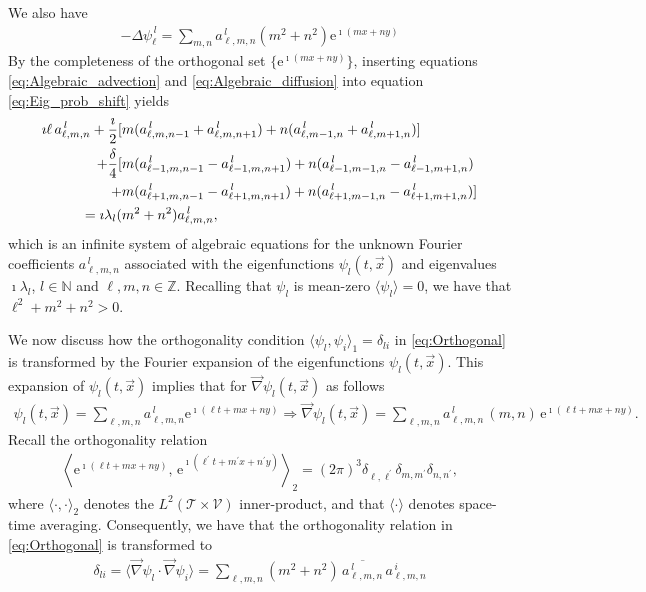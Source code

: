 \documentclass{article}
\newcommand{\e}{\mathrm{e}}
\newcommand{\Tc}{\mathcal{T}}
\newcommand{\Vc}{\mathcal{V}}
\newcommand{\0}{\mathbf{0}}
\newcommand{\1}{\mathbf{1}}
\newcommand{\2}{\mathbf{2}}
\newcommand{\3}{\mathbf{3}}
\newcommand{\4}{\mathbf{4}}
\newcommand{\5}{\mathbf{5}}
\newcommand{\6}{\mathbf{6}}
\newcommand{\7}{\mathbf{7}}
\newcommand{\8}{\mathbf{8}}
\begin{document}
%
We also have 
%
\begin{align}\label{eq:Algebraic_diffusion}
  -\Delta\psi_\ell^{\,l}=\sum_{m,n}a^{\,l}_{\ell,m,n}(m^2+n^2)\e^{\imath (mx+ny)}
\end{align}
%
By the completeness of the orthogonal set $\{\e^{\imath (mx+ny)}\}$, 
inserting equations \eqref{eq:Algebraic_advection} and
\eqref{eq:Algebraic_diffusion} into equation
\eqref{eq:Eig_prob_shift} yields
%
\begin{align}\label{eq:Fourier_Coef_System}
\imath \ell\,a^{\,l}_{\ell,m,n}+\frac{\imath}{2}
[&m(a^{\,l}_{\ell,m,n-1}+a^{\,l}_{\ell,m,n+1})+n(a^{\,l}_{\ell,m-1,n}+a^{\,l}_{\ell,m+1,n})]
\notag\\
+\frac{\delta}{4}[&m(a^{\,l}_{\ell-1,m,n-1}-a^{\,l}_{\ell-1,m,n+1})+n(a^{\,l}_{\ell-1,m-1,n}-a^{\,l}_{\ell-1,m+1,n})
\notag\\
+&m(a^{\,l}_{\ell+1,m,n-1}-a^{\,l}_{\ell+1,m,n+1})+n(a^{\,l}_{\ell+1,m-1,n}-a^{\,l}_{\ell+1,m+1,n})]
\notag\\
=\imath\lambda_l(&m^2+n^2)a^{\,l}_{\ell,m,n},
\end{align}
%
which is an infinite system of algebraic equations for the unknown
Fourier coefficients $a^{\,l}_{\ell,m,n}$ associated with the
eigenfunctions $\psi_l(t,\vec{x})$ and eigenvalues $\imath\lambda_l$,
$l\in\mathbb{N}$ and $\ell,m,n\in\mathbb{Z}$. Recalling that $\psi_l$ is
mean-zero $\langle\psi_l\rangle=0$, we have that $\ell^2+m^2+n^2>0$.




We now discuss how the orthogonality condition
$\langle\psi_l,\psi_i\rangle_1=\delta_{li}$ in \eqref{eq:Orthogonal} is
transformed by the Fourier expansion of the
eigenfunctions $\psi_l(t,\vec{x})$. This expansion of $\psi_l(t,\vec{x})$ 
implies that for $\vec{\nabla}\psi_l(t,\vec{x})$ as follows 
%
\begin{align}\label{eq:Eigenfunction_Grad_expansion}
  \psi_l(t,\vec{x})=\sum_{\ell,m,n}a^{\,l}_{\ell,m,n}\e^{\imath (\ell t+mx+ny)}\Rightarrow
  \vec{\nabla}\psi_l(t,\vec{x})=\sum_{\ell,m,n}a^{\,l}_{\ell,m,n}\,(m,n)\,\e^{\imath (\ell t+mx+ny)}.
\end{align}
%
Recall the orthogonality relation 
%
\begin{align}\label{eq:Trig_orthogonal}  
      \left\langle
      \e^{\imath (\ell t+mx+ny)},\,\e^{\imath (\ell^\prime t+m^\prime x+n^\prime y)}
      \right\rangle_2
      =
      (2\pi)^3\delta_{\ell,\ell^\prime}\delta_{m,m^\prime}\delta_{n,n^\prime},
\end{align}
%
where $\langle\cdot,\cdot\rangle_2$ denotes the $L^2(\Tc\times\Vc)$ inner-product, and that
$\langle\cdot\rangle$ denotes space-time averaging. Consequently, we have that the
orthogonality relation in \eqref{eq:Orthogonal} is transformed to   
%
\begin{align}\label{eq:Ortho_Clmn}
  \delta_{li}=\langle\vec{\nabla}\psi_l\cdot\vec{\nabla}\psi_i\rangle
      = \sum_{\ell,m,n}(m^2+n^2)\,\overline{a^{\,l}_{\ell,m,n}}\,a^{\,i}_{\ell,m,n}
\end{align}
%
\end{document}
